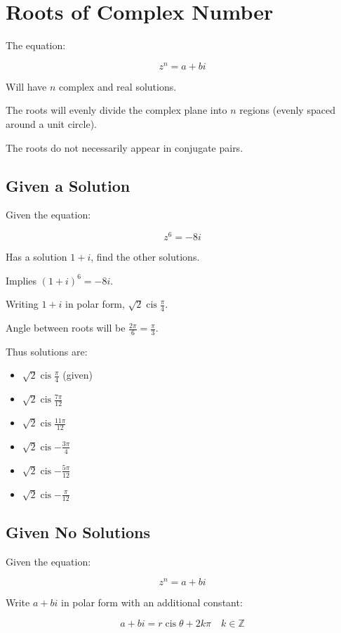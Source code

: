 \documentclass[a4paper,11pt]{report}
\DeclareMathOperator\cis{cis}
\begin{document}
\section{Roots of Complex Number}

The equation:

$$
z^n = a + bi
$$

Will have $n$ complex and real solutions.

The roots will evenly divide the complex plane into $n$ regions (evenly spaced
around a unit circle).

The roots do not necessarily appear in conjugate pairs.

\subsection{Given a Solution}

Given the equation:

$$
z^6 = -8i
$$

Has a solution $1 + i$, find the other solutions.

Implies $(1 + i)^6 = -8i$.

Writing $1 + i$ in polar form, $\sqrt{2} \cis{\frac{\pi}{4}}$.

Angle between roots will be $\frac{2\pi}{6} = \frac{\pi}{3}$.

Thus solutions are:

\begin{itemize}
\item $\sqrt{2} \cis{\frac{\pi}{4}}$ (given)
\item $\sqrt{2} \cis{\frac{7\pi}{12}}$
\item $\sqrt{2} \cis{\frac{11\pi}{12}}$
\item $\sqrt{2} \cis{-\frac{3\pi}{4}}$
\item $\sqrt{2} \cis{-\frac{5\pi}{12}}$
\item $\sqrt{2} \cis{-\frac{\pi}{12}}$
\end{itemize}

\subsection{Given No Solutions}

Given the equation:

$$
z^n = a + bi
$$

Write $a + bi$ in polar form with an additional constant:

$$
a + bi = r \cis{\theta + 2k\pi} \quad k \in \mathbb{Z}
$$
\end{document}
